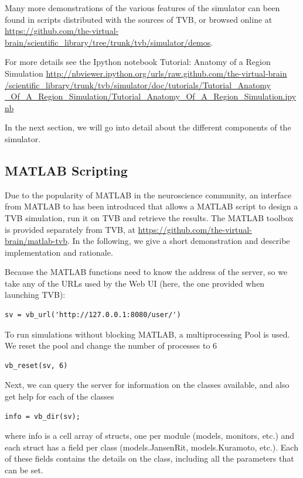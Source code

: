 Many more demonstrations of the various features of the simulator
can been found in scripts distributed with the sources of TVB, or 
browsed online at \url{https://github.com/the-virtual-brain/scientific_library/tree/trunk/tvb/simulator/demos}.

For more details see the Ipython notebook Tutorial: Anatomy of a Region Simulation 
\url{http://nbviewer.ipython.org/urls/raw.github.com/the-virtual-brain
/scientific_library/trunk/tvb/simulator/doc/tutorials/Tutorial_Anatomy
_Of_A_Region_Simulation/Tutorial_Anatomy_Of_A_Region_Simulation.ipynb}

In the next section, we will go into detail about the different
components of the simulator.

\subsection{MATLAB Scripting}

Due to the popularity of MATLAB in the neuroscience community, an
interface from MATLAB to \TVB has been introduced that allows a MATLAB
script to design a TVB simulation, run it on TVB and retrieve the 
results. The MATLAB toolbox is provided separately from TVB, at
\url{https://github.com/the-virtual-brain/matlab-tvb}.
In the following, we give a short demonstration and 
describe implementation and rationale.

Because the MATLAB functions need to know the address of the server,
so we take any of the URLs used by the Web UI (here, the one provided
when launching TVB):

\begin{lstlisting}
sv = vb_url('http://127.0.0.1:8080/user/')
\end{lstlisting}

To run simulations without blocking MATLAB, a multiprocessing Pool
is used. We reset the pool and change the number of processes to 6

\begin{lstlisting}
vb_reset(sv, 6)
\end{lstlisting}

Next, we can query the server for information on the classes available,
and also get help for each of the classes

\begin{lstlisting}
info = vb_dir(sv);
\end{lstlisting}

\noindent where info is a cell array of structs, one per module (models,
monitors, etc.) and each struct has a field per class (models.JansenRit, 
models.Kuramoto, etc.). Each of these fields contains the details on 
the class, including all the parameters that can be set. 

